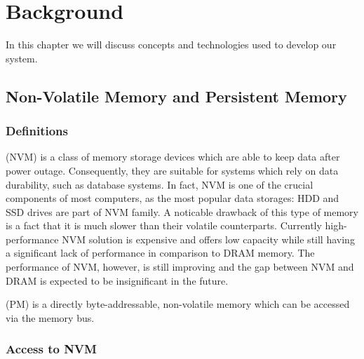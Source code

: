 \chapter{Background} \label{Background}

In this chapter we will discuss concepts and technologies used to develop our system.

\section{Non-Volatile Memory and Persistent Memory}
    
    
    \subsection{Definitions}
        \NVM (NVM) is a class of memory storage devices which are able to keep data after power outage. Consequently, they are suitable for systems which rely on data durability, such as database systems.
        In fact, NVM is one of the crucial components of most computers, as the most popular data storages: HDD and SSD drives are part of NVM family.
        A noticable drawback of this type of memory is a fact that it is much slower than their volatile counterparts. 
        Currently high-performance NVM solution is expensive and offers low capacity while still having a significant lack of performance in comparison to DRAM memory. 
        The performance of NVM, however, is still improving and the gap between NVM and DRAM is expected to be insignificant in the future. 
        
        \PM (PM) is a directly byte-addressable, non-volatile memory which can be accessed via the memory bus.
        
    \subsection{Access to NVM \cite{PmemAccess}}
    
